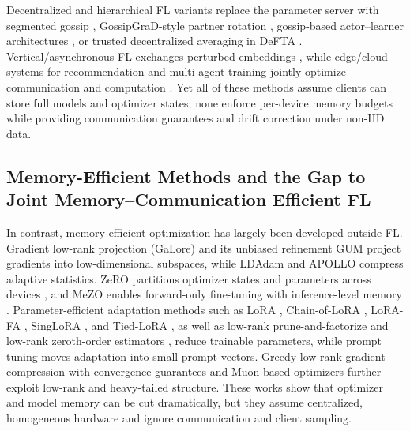 \documentclass[11pt]{article}
\begin{document}
Decentralized and hierarchical FL variants replace the parameter server with segmented gossip \citep{hu2019decentralized}, GossipGraD-style partner rotation \citep{daily2018gossipgrad}, gossip-based actor--learner architectures \citep{Assran2019GossipbasedAA}, or trusted decentralized averaging in DeFTA \citep{zhou2022defta}. Vertical/asynchronous FL exchanges perturbed embeddings \citep{chen2020vafl}, while edge/cloud systems for recommendation and multi-agent training jointly optimize communication and computation \citep{feng2024leveraging,mohammadabadi2024communication}. Yet all of these methods assume clients can store full models and optimizer states; none enforce per-device memory budgets while providing communication guarantees and drift correction under non-IID data.

\subsection{Memory-Efficient Methods and the Gap to Joint Memory--Communication Efficient FL}

In contrast, memory-efficient optimization has largely been developed outside FL. Gradient low-rank projection (GaLore) \citep{Zhao2024GaLoreML} and its unbiased refinement GUM \citep{pan2025unbiased} project gradients into low-dimensional subspaces, while LDAdam \citep{Robert2024LDAdamAO} and APOLLO \citep{zhu2024apollo} compress adaptive statistics. ZeRO partitions optimizer states and parameters across devices \citep{Rajbhandari2019ZeROMO}, and MeZO enables forward-only fine-tuning with inference-level memory \citep{Malladi2023FineTuningLM}. Parameter-efficient adaptation methods such as LoRA \citep{Hu2021LoRALA}, Chain-of-LoRA \citep{xia2024chain}, LoRA-FA \citep{zhang2023lora}, SingLoRA \citep{bensaid2025singlora}, and Tied-LoRA \citep{renduchintala2024tied}, as well as low-rank prune-and-factorize \citep{ren2024low} and low-rank zeroth-order estimators \citep{chen2024enhancing}, reduce trainable parameters, while prompt tuning \citep{Lester2021ThePO} moves adaptation into small prompt vectors. Greedy low-rank gradient compression with convergence guarantees \citep{chen2025greedy} and Muon-based optimizers \citep{wang2025muon} further exploit low-rank and heavy-tailed structure. These works show that optimizer and model memory can be cut dramatically, but they assume centralized, homogeneous hardware and ignore communication and client sampling.
\end{document}
